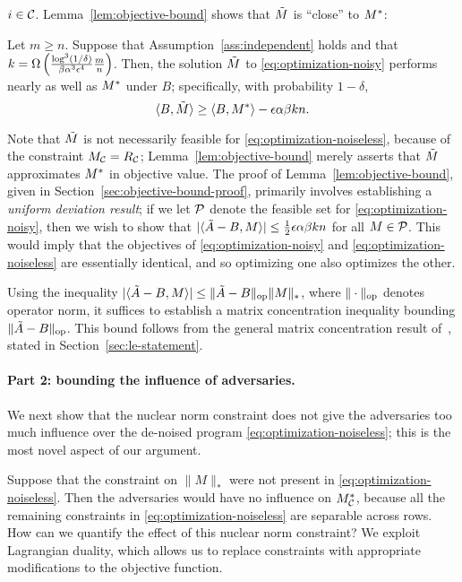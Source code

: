 $i \in \mathcal{C}$. Lemma~\ref{lem:objective-bound} shows that $\tilde{M}$ is ``close'' to $M^*$: 
\begin{lemma}
\label{lem:objective-bound}
Let $m \geq n$. Suppose that Assumption~\ref{ass:independent} holds and that 
$k = \Omega\left(  \frac{\log^3(1/\delta)}{\beta\alpha^3\epsilon^4}\frac{m}{n} \right)$. 
Then, the solution $\tilde{M}$ to \eqref{eq:optimization-noisy} performs nearly as 
well as $M^*$ under $B$; specifically, with probability $1-\delta$,
\begin{equation}
\label{eq:objective-bound}
\langle B, \tilde{M} \rangle \geq \langle B, M^* \rangle - \epsilon \alpha\beta kn.
\end{equation}
\end{lemma}
Note that $\tilde{M}$ is not necessarily feasible for \eqref{eq:optimization-noiseless}, 
because of the constraint $M_{\mathcal{C}} = R_{\mathcal{C}}$; Lemma~\ref{lem:objective-bound} 
merely asserts that $\tilde{M}$ approximates $M^*$ in objective value. The proof of 
Lemma~\ref{lem:objective-bound}, given in Section~\ref{sec:objective-bound-proof}, 
primarily involves establishing a 
\emph{uniform deviation result}; if we let $\mathcal{P}$ denote the feasible set for 
\eqref{eq:optimization-noisy}, then we wish to show that 
$|\langle \tilde{A} - B, M \rangle| \leq \frac{1}{2}\epsilon \alpha\beta kn$ for all 
$M \in \mathcal{P}$. This would imply that the objectives of 
\eqref{eq:optimization-noisy} and \eqref{eq:optimization-noiseless} are 
essentially identical, and so optimizing one also optimizes the other.

Using the inequality $|\langle \tilde{A} - B, M \rangle| \leq \|\tilde{A}-B\|_{\mathrm{op}}\|M\|_*$, 
where $\|\cdot\|_{\mathrm{op}}$ denotes operator norm, it suffices to establish a matrix 
concentration inequality bounding $\|\tilde{A} - B\|_{\mathrm{op}}$.   
This bound follows from the general matrix concentration result of~\cite{le2015concentration},
stated in Section~\ref{sec:le-statement}.

\paragraph{Part 2: bounding the influence of adversaries.} 
We next show that the nuclear norm constraint does 
not give the adversaries too much influence over the de-noised program 
\eqref{eq:optimization-noiseless}; this is the most novel aspect 
of our argument.




Suppose that the constraint on $\|M\|_*$ were not present in 
\eqref{eq:optimization-noiseless}. Then the adversaries would have 
no influence on $M^*_{\mathcal{C}}$, because all the remaining constraints 
in \eqref{eq:optimization-noiseless} are separable across rows. 
How can we quantify the effect of this nuclear norm constraint?
We exploit Lagrangian duality, which allows us to replace constraints 
with appropriate modifications to the objective function.

